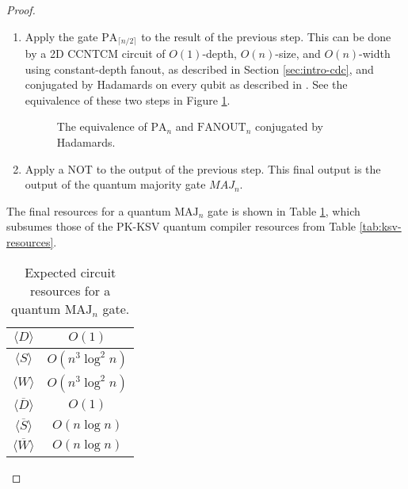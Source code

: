 \begin{proof}
\begin{enumerate}
\item
Apply the gate $\text{PA}_{\lceil n/2 \rceil}$ to the result of
the previous step. This can be done by a \textsf{2D CCNTCM} circuit of
$O(1)$-depth, $O(n)$-size, and $O(n)$-width using constant-depth
fanout, as described in Section \ref{sec:intro-cdc}, and conjugated by
Hadamards on every qubit as described in \cite{Moore1998}. See
the equivalence of these two steps in Figure \ref{fig:pa-fanout}.

\begin{figure}[htb!]
\caption{The equivalence of $\text{PA}_n$ and $\text{FANOUT}_n$ conjugated by Hadamards.}
\label{fig:pa-fanout}
\end{figure}

\item
Apply a NOT to the output of the previous step. This final
output is the output of the quantum majority gate $MAJ_{n}$.

\end{enumerate}

The final resources for a quantum $\text{MAJ}_n$ gate is shown in
Table \ref{tab:maj-resources}, which subsumes those of the PK-KSV quantum compiler
resources from Table \ref{tab:ksv-resources}.

\begin{table}[htb!]
\begin{tabular}{c|c|}
\hline
$\langle D \rangle$ & $O(1)$ \\
\hline
$\langle S \rangle$ & $O(n^3\log^2 n)$ \\
\hline
$\langle W \rangle$ & $O(n^3 \log^2 n)$ \\
\hline
$\langle \overline{D} \rangle$ & $O(1)$ \\
\hline
$\langle \overline{S} \rangle$ & $O(n\log n)$ \\
\hline
$\langle \overline{W} \rangle$ & $O(n\log n)$ \\
\hline
\end{tabular}
\caption{Expected circuit resources for a quantum $\text{MAJ}_n$ gate.}
\label{tab:maj-resources}
\end{table}

\end{proof}